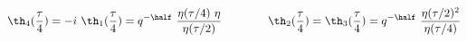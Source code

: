 \begin{equation}
  \th_4({\tau\over 4})= -i~\th_1({\tau\over 4}) =
  q^{-\half}~{\eta(\tau/4)~\eta\over\eta(\tau/2)} \qquad \qquad
  \th_2({\tau\over 4})= \th_3({\tau\over 4}) =
  q^{-\half}~{\eta(\tau/2)^2 \over\eta(\tau/4)}
\end{equation}

